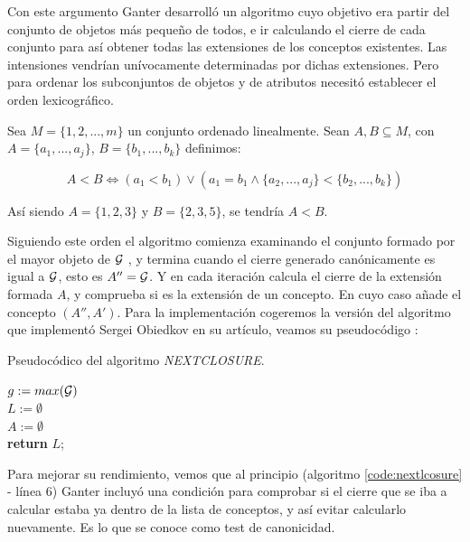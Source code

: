 \documentclass[oneside,openright,titlepage,numbers=noenddot,openany,headinclude,footinclude=true,
cleardoublepage=empty,abstractoff,BCOR=5mm,paper=a4,fontsize=12pt,main=spanish]{scrreprt}
\begin{document}
Con este argumento Ganter desarrolló un algoritmo cuyo objetivo era partir del conjunto de objetos más pequeño de todos, e ir calculando el cierre de cada conjunto para así obtener todas las extensiones de los conceptos existentes. Las intensiones vendrían unívocamente determinadas por dichas extensiones. Pero para ordenar los subconjuntos de objetos y de atributos necesitó establecer el orden lexicográfico.

\begin{definition}
Sea $M=\{1,2,...,m\}$ un conjunto ordenado linealmente. Sean $A,B\subseteq M$, con $A=\{a_1,...,a_j\}$, $B=\{b_1,...,b_k\}$ definimos:

$$A<B \Longleftrightarrow (a_1 < b_1) \vee (a_1= b_1 \wedge \{a_2,...,a_j\} < \{b_2,...,b_k\}) $$
\end{definition}

Así siendo $A=\{1,2,3\}$ y $B=\{2,3,5\}$, se tendría $A<B$.

Siguiendo este orden el algoritmo comienza examinando el conjunto formado por el mayor objeto de $\mathcal{G}$ , y termina cuando el cierre generado canónicamente es igual a $\mathcal{G}$, esto es $A''=\mathcal{G}$.  Y en cada iteración calcula el cierre de la extensión formada $A$, y comprueba si es la extensión de un concepto. En cuyo caso añade el concepto $(A'',A')$. Para la implementación cogeremos la versión del algoritmo que implementó Sergei Obiedkov en su artículo, veamos su pseudocódigo \cite{comparingperformance}:

\begin{algorithm}[H]
\caption{Pseudocódico del algoritmo \textit{NEXTCLOSURE}.}
\label{code:nextlcosure}
     $g:=max (\mathcal{G})$\\
     $L:=\emptyset$\\
     $A:=\emptyset$\\
     \textbf{return} $L$;
     
\end{algorithm}

Para mejorar su rendimiento, vemos que al principio (algoritmo \ref{code:nextlcosure} - línea 6) Ganter incluyó una condición para comprobar si el cierre que se iba a calcular estaba ya dentro de la lista de conceptos, y así evitar calcularlo nuevamente. Es lo que se conoce como test de canonicidad.
\end{document}
